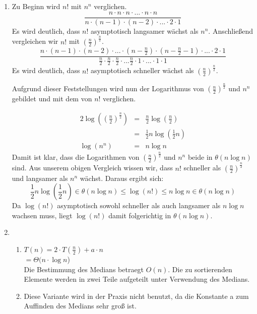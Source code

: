\documentclass{article}
\begin{document}
\begin{enumerate}[\bfseries1.]
    \item
         Zu Beginn wird $n!$ mit $n^{n}$ verglichen.
        \[
                \frac{n \cdot n \cdot n \cdot \text{...} \cdot n \cdot n}{n \cdot (n-1) \cdot (n-2) \cdot \text{...} \cdot 2 \cdot 1}
        \]
        Es wird deutlich, dass $n!$ asymptotisch langsamer 
        wächst als $n^{n}$. Anschließend vergleichen wir $n!$
        mit $\left(\frac{n}{2}\right)^{\frac{n}{2}}$.
        \[
                \frac{n \cdot (n-1) \cdot (n-2) \cdot ... \cdot (n- \frac{n}{2}) \cdot (n - \frac{n}{2} - 1) \cdot ... \cdot 2 \cdot 1}{\frac{n}{2} \cdot \frac{n}{2} \cdot \frac{n}{2} \cdot ... \frac{n}{2} \cdot 1 \cdot ... \cdot 1 \cdot 1}
        \]
        Es wird deutlich, dass $n!$ asymptotisch schneller 
        wächst als $\left(\frac{n}{2}\right)^{\frac{n}{2}}$.
        
        Aufgrund dieser Feststellungen wird nun der Logarithmus
        von $\left(\frac{n}{2}\right)^{\frac{n}{2}}$ und $n^{n}$ 
        gebildet und mit dem von $n!$ verglichen.

        \begin{alignat*}{2}
                \log\left(\left(\frac{n}{2}\right)^{\frac{n}{2}}\right) &=& \frac{n}{2} \log\left(\frac{n}{2}\right) \\
                &=& \frac{1}{2}n \log\left(\frac{1}{2}n\right) \\
                \log(n^{n}) &=& n \log n
        \end{alignat*}
        Damit ist klar, dass die Logarithmen von 
        $\left(\frac{n}{2}\right)^{\frac{n}{2}}$ und $n^{n}$ beide
        in $\theta(n \log n)$ sind. Aus unserem obigen Vergleich wissen 
        wir, dass $n!$ schneller als $\left(\frac{n}{2}\right)^{\frac{n}{2}}$ 
        und langsamer als $n^{n}$ wächst. Daraus ergibt sich:
        \[
                \frac{1}{2}n\log(\frac{1}{2}n) \in \theta(n \log n) \leq \log(n!) \leq n \log n \in \theta(n \log n)
        \]
        Da $\log(n!)$ asymptotisch sowohl schneller als auch langsamer 
        als $n \log n$ wachsen muss, liegt $\log(n!)$ damit  folgerichtig in $\theta(n \log n)$.
    \item
        \begin{enumerate}
             \item $T(n)=2\cdot T(\frac{n}{2})+a\cdot n$ \\
                      $= \Theta (n\cdot \log{n}$) \\
                      Die Bestimmung des Medians betraegt $O(n)$. Die zu sortierenden Elemente werden in zwei Teile aufgeteilt unter Verwendung des Medians.
             \item Diese Variante wird in der Praxis nicht benutzt, da die
            Konstante a zum Auffinden des Medians sehr groß ist.
                

\end{enumerate}
\end{enumerate}
\end{document}
